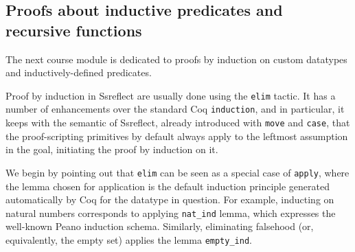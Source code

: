 \documentclass[blockstyle,preprint]{sigplanconf}
\newcommand{\is}[1]{\textcolor{blue}{(Ilya: {#1})}}
\newcommand{\an}[1]{\textcolor{red}{(Aleks: {#1})}}
\newcommand{\code}[1]{\lstinline{#1}}
\begin{document}
\subsection{Proofs about inductive predicates and recursive functions}
\label{sec:induction}
The next course module is dedicated to proofs by induction on custom
datatypes and inductively-defined predicates.

Proof by induction in Ssreflect are usually done using the \code{elim}
tactic. It has a number of enhancements over the standard Coq
\code{induction}, and in particular, it keeps with the semantic of
Ssreflect, already introduced with \code{move} and \code{case}, that
the proof-scripting primitives by default always apply to the leftmost
assumption in the goal, initiating the proof by induction on it.
%
%

We begin by pointing out that \code{elim} can be seen as a special
case of \code{apply}, where the lemma chosen for application is the
default induction principle generated automatically by Coq for the
datatype in question. For example, inducting on natural numbers
corresponds to applying \code{nat_ind} lemma, which expresses the
well-known Peano induction schema. Similarly, eliminating falsehood
(or, equivalently, the empty set) applies the lemma \code{empty_ind}.
%
%
\end{document}
